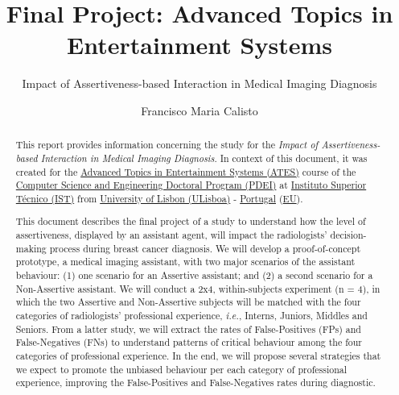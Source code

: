 \documentclass[sigchi]{acmart}
\begin{document}
\title[Final Project]{\normalsize Final Project: Advanced Topics in Entertainment Systems}
\subtitle{Impact of Assertiveness-based Interaction in Medical Imaging Diagnosis}

\author{Francisco Maria Calisto}

\renewcommand{\shortauthors}{Calisto}


\begin{abstract}

This report provides information concerning the study for the \textit{Impact of Assertiveness-based Interaction in Medical Imaging Diagnosis}.
In context of this document, it was created for the \hyperlink{https://fenix.tecnico.ulisboa.pt/disciplinas/TASE4/2019-2020/2-semestre}{Advanced Topics in Entertainment Systems (ATES)} course of the \hyperlink{https://fenix.tecnico.ulisboa.pt/cursos/deic/curriculo}{Computer Science and Engineering Doctoral Program (PDEI)} at \hyperlink{https://tecnico.ulisboa.pt/en/}{Instituto Superior T\'{e}cnico (IST)} from \hyperlink{https://www.ulisboa.pt/}{University of Lisbon (ULisboa)} - \hyperlink{https://www.portugal.gov.pt/en/}{Portugal} (\hyperlink{https://europa.eu}{EU}).

This document describes the final project of a study to understand how the level of assertiveness, displayed by an assistant agent, will impact the radiologists' decision-making process during breast cancer diagnosis.
We will develop a proof-of-concept prototype, a medical imaging assistant, with two major scenarios of the assistant behaviour:
(1) one scenario for an Assertive assistant; and
(2) a second scenario for a Non-Assertive assistant.
We will conduct a 2x4, within-subjects experiment (n = 4), in which the two Assertive and Non-Assertive subjects will be matched with the four categories of radiologists' professional experience, {\it i.e.}, Interns, Juniors, Middles and Seniors.
From a latter study, we will extract the rates of False-Positives (FPs) and False-Negatives (FNs) to understand patterns of critical behaviour among the four categories of professional experience.
In the end, we will propose several strategies that we expect to promote the unbiased behaviour per each category of professional experience, improving the False-Positives and False-Negatives rates during diagnostic.

\end{abstract}
\end{document}
